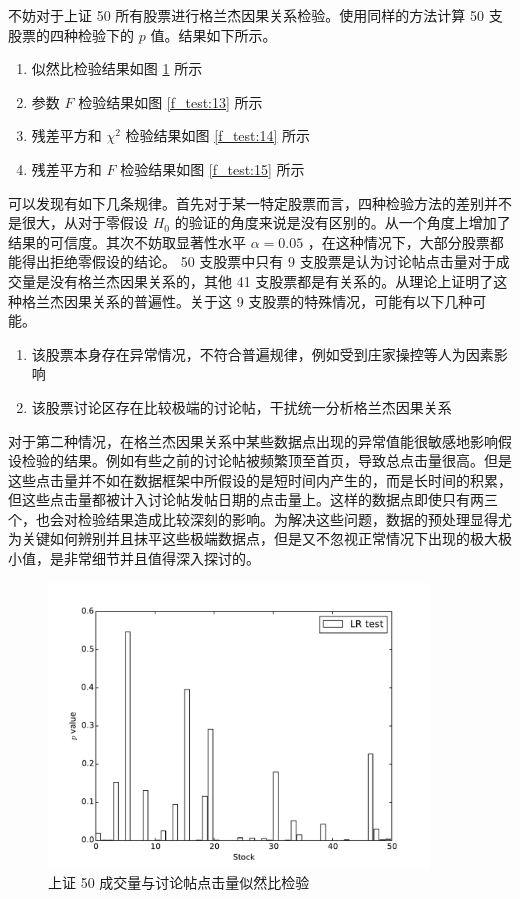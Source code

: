 不妨对于上证 50 所有股票进行格兰杰因果关系检验。使用同样的方法计算 50 支股票的四种检验下的 $p$ 值。结果如下所示。

\begin{enumerate}
  \item 似然比检验结果如图 \ref{f_test:12} 所示
  \item 参数 $F$ 检验结果如图 \ref{f_test:13} 所示
  \item 残差平方和 $\chi^{2}$ 检验结果如图 \ref{f_test:14} 所示
  \item 残差平方和 $F$ 检验结果如图 \ref{f_test:15} 所示
\end{enumerate}

可以发现有如下几条规律。首先对于某一特定股票而言，四种检验方法的差别并不是很大，从对于零假设 $H_{0}$ 的验证的角度来说是没有区别的。从一个角度上增加了结果的可信度。其次不妨取显著性水平 $\alpha=0.05$ ，在这种情况下，大部分股票都能得出拒绝零假设的结论。 50 支股票中只有 9 支股票是认为讨论帖点击量对于成交量是没有格兰杰因果关系的，其他 41 支股票都是有关系的。从理论上证明了这种格兰杰因果关系的普遍性。关于这 9 支股票的特殊情况，可能有以下几种可能。

\begin{enumerate}
  \item 该股票本身存在异常情况，不符合普遍规律，例如受到庄家操控等人为因素影响
  \item 该股票讨论区存在比较极端的讨论帖，干扰统一分析格兰杰因果关系
\end{enumerate}

对于第二种情况，在格兰杰因果关系中某些数据点出现的异常值能很敏感地影响假设检验的结果。例如有些之前的讨论帖被频繁顶至首页，导致总点击量很高。但是这些点击量并不如在数据框架中所假设的是短时间内产生的，而是长时间的积累，但这些点击量都被计入讨论帖发帖日期的点击量上。这样的数据点即使只有两三个，也会对检验结果造成比较深刻的影响。为解决这些问题，数据的预处理显得尤为关键如何辨别并且抹平这些极端数据点，但是又不忽视正常情况下出现的极大极小值，是非常细节并且值得深入探讨的。

\begin{figure}
  \centering
  \includegraphics[width=0.9\textwidth]{plots/granger_causality_test_on_sse_50_lrtest.pdf}
  \caption{上证 50 成交量与讨论帖点击量似然比检验}
  \label{f_test:12}
\end{figure}

